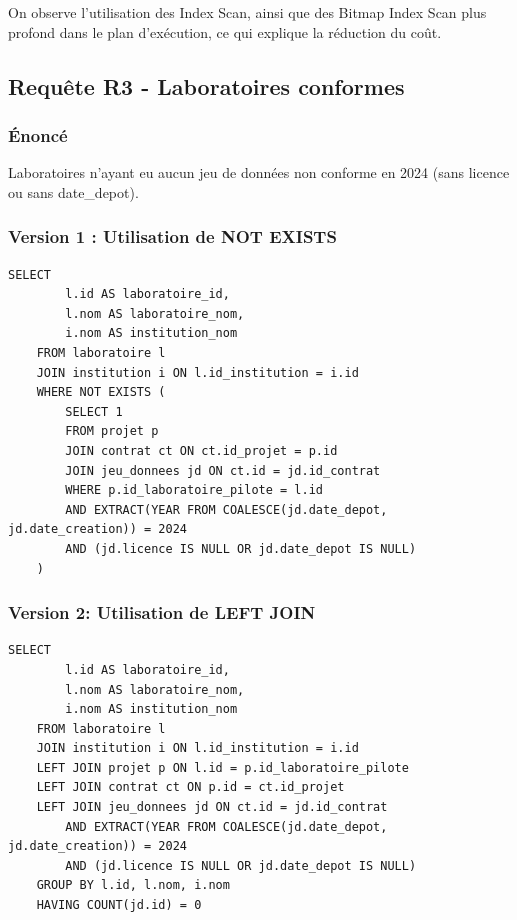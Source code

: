 \documentclass[12pt,a4paper]{article}
\begin{document}
On observe l'utilisation des Index Scan, ainsi que des Bitmap Index Scan plus profond dans le plan d'exécution, ce qui explique la réduction du coût.

\subsection{Requête R3 - Laboratoires conformes}

\subsubsection{Énoncé}
Laboratoires n'ayant eu aucun jeu de données non conforme en 2024 (sans licence ou sans date\_depot).

\subsubsection{Version 1 : Utilisation de NOT EXISTS}
\begin{lstlisting}[style=sqlstyle, caption=R3 - Version 1]
    SELECT 
        l.id AS laboratoire_id,
        l.nom AS laboratoire_nom,
        i.nom AS institution_nom
    FROM laboratoire l
    JOIN institution i ON l.id_institution = i.id
    WHERE NOT EXISTS (
        SELECT 1
        FROM projet p
        JOIN contrat ct ON ct.id_projet = p.id
        JOIN jeu_donnees jd ON ct.id = jd.id_contrat
        WHERE p.id_laboratoire_pilote = l.id
        AND EXTRACT(YEAR FROM COALESCE(jd.date_depot, jd.date_creation)) = 2024
        AND (jd.licence IS NULL OR jd.date_depot IS NULL)
    )
\end{lstlisting}

\subsubsection{Version 2: Utilisation de LEFT JOIN}
\begin{lstlisting}[style=sqlstyle, caption=R3 - Version 2]
    SELECT 
        l.id AS laboratoire_id,
        l.nom AS laboratoire_nom,
        i.nom AS institution_nom
    FROM laboratoire l
    JOIN institution i ON l.id_institution = i.id
    LEFT JOIN projet p ON l.id = p.id_laboratoire_pilote
    LEFT JOIN contrat ct ON p.id = ct.id_projet
    LEFT JOIN jeu_donnees jd ON ct.id = jd.id_contrat
        AND EXTRACT(YEAR FROM COALESCE(jd.date_depot, jd.date_creation)) = 2024
        AND (jd.licence IS NULL OR jd.date_depot IS NULL)
    GROUP BY l.id, l.nom, i.nom
    HAVING COUNT(jd.id) = 0
\end{lstlisting}
\end{document}

